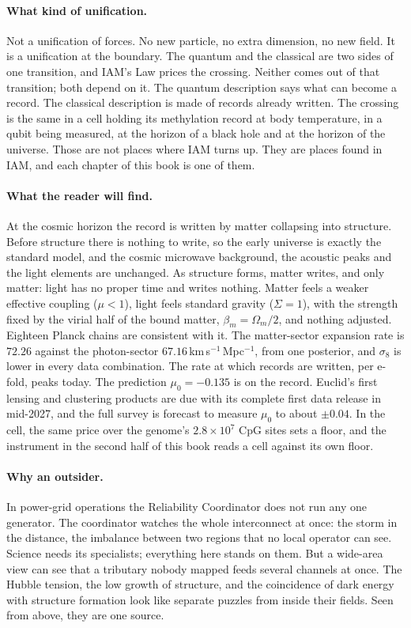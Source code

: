 \paragraph{What kind of unification.} Not a unification of forces. No new particle, no extra dimension, no new field. It is a unification at the
boundary. The quantum and the classical are two sides of one transition, and IAM's Law prices the crossing. Neither comes out of that transition;
both depend on it. The quantum description says what can become a record. The classical description is made of records already written. The
crossing is the same in a cell holding its methylation record at body temperature, in a qubit being measured, at the horizon of a black hole and at
the horizon of the universe. Those are not places where IAM turns up. They are places found in IAM, and each chapter of this book is one of them.

\paragraph{What the reader will find.} At the cosmic horizon the record is written by matter collapsing into structure. Before structure there is
nothing to write, so the early universe is exactly the standard model, and the cosmic microwave background, the acoustic peaks and the light
elements are unchanged. As structure forms, matter writes, and only matter: light has no proper time and writes nothing. Matter feels a weaker
effective coupling ($\mu<1$), light feels standard gravity ($\Sigma=1$), with the strength fixed by the virial half of the bound matter,
$\beta_m=\Omega_m/2$, and nothing adjusted. Eighteen Planck chains are consistent with it. The matter-sector expansion rate is $72.26$ against the
photon-sector $67.16$\,km\,s$^{-1}$\,Mpc$^{-1}$, from one posterior, and $\sigma_8$ is lower in every data combination. The rate at which records
are written, per e-fold, peaks today. The prediction $\mu_0=-0.135$ is on the record. Euclid's first lensing and clustering products are due with its complete first
data release in mid-2027, and the full survey is forecast to measure $\mu_0$ to about $\pm0.04$. In the cell, the same price over the genome's $2.8\times10^7$ CpG sites sets a floor, and the instrument in the
second half of this book reads a cell against its own floor.

\paragraph{Why an outsider.} In power-grid operations the Reliability Coordinator does not run any one generator. The coordinator watches the
whole interconnect at once: the storm in the distance, the imbalance between two regions that no local operator can see. Science needs its
specialists; everything here stands on them. But a wide-area view can see that a tributary nobody mapped feeds several channels at once. The
Hubble tension, the low growth of structure, and the coincidence of dark energy with structure formation look like separate puzzles from inside
their fields. Seen from above, they are one source.

